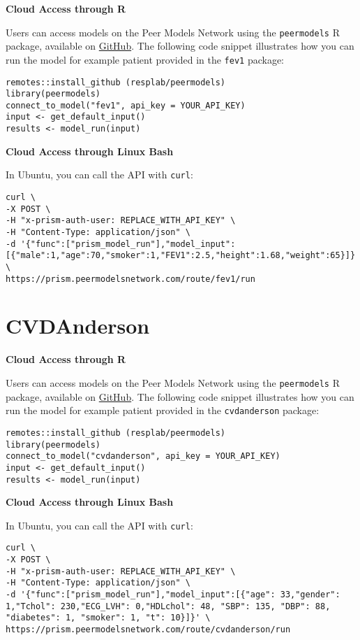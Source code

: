 \documentclass[
]{book}
\begin{document}
\textbf{Cloud Access through R}

Users can access models on the Peer Models Network using the \texttt{peermodels} R package, available on \href{https://github.com/resplab/peermodels}{GitHub}. The following code snippet illustrates how you can run the model for example patient provided in the \texttt{fev1} package:

\begin{verbatim}
remotes::install_github (resplab/peermodels)
library(peermodels)
connect_to_model("fev1", api_key = YOUR_API_KEY)
input <- get_default_input()
results <- model_run(input)
\end{verbatim}

\textbf{Cloud Access through Linux Bash}

In Ubuntu, you can call the API with \texttt{curl}:

\begin{verbatim}
curl \
-X POST \
-H "x-prism-auth-user: REPLACE_WITH_API_KEY" \
-H "Content-Type: application/json" \
-d '{"func":["prism_model_run"],"model_input":[{"male":1,"age":70,"smoker":1,"FEV1":2.5,"height":1.68,"weight":65}]}' \
https://prism.peermodelsnetwork.com/route/fev1/run
\end{verbatim}

\hypertarget{cvdanderson-1}{%
\section{CVDAnderson}\label{cvdanderson-1}}

\textbf{Cloud Access through R}

Users can access models on the Peer Models Network using the \texttt{peermodels} R package, available on \href{https://github.com/resplab/peermodels}{GitHub}. The following code snippet illustrates how you can run the model for example patient provided in the \texttt{cvdanderson} package:

\begin{verbatim}
remotes::install_github (resplab/peermodels)
library(peermodels)
connect_to_model("cvdanderson", api_key = YOUR_API_KEY)
input <- get_default_input()
results <- model_run(input)
\end{verbatim}

\textbf{Cloud Access through Linux Bash}

In Ubuntu, you can call the API with \texttt{curl}:

\begin{verbatim}
curl \
-X POST \
-H "x-prism-auth-user: REPLACE_WITH_API_KEY" \
-H "Content-Type: application/json" \
-d '{"func":["prism_model_run"],"model_input":[{"age": 33,"gender": 1,"Tchol": 230,"ECG_LVH": 0,"HDLchol": 48, "SBP": 135, "DBP": 88, "diabetes": 1, "smoker": 1, "t": 10}]}' \
https://prism.peermodelsnetwork.com/route/cvdanderson/run
\end{verbatim}
\end{document}
